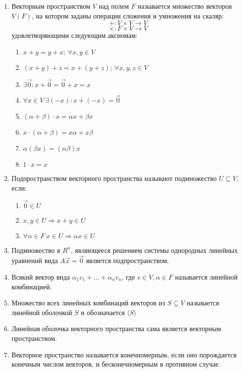 \documentclass[a4paper,12pt]{article}
\begin{document}
\begin{enumerate}
		\item Векторным пространством $V$ над полем $F$  называется множество векторов $V(F)$, на котором заданы операции сложения и умножения на скаляр:
		\[
		+: V \times V \to V\]\[
		\times: F \times V \to V
		\]
		удовлетворяющими следующим аксиомам:
		\begin{enumerate}
			\item $x + y = y + x; \ \forall x, y \in V$
			\item $(x + y) + z = x + (y + z); \ \forall x, y, z \in V$
			\item $\exists \vec{0}: x + \vec{0} = \vec{0} + x = x$
			\item $\forall x \in V \ \exists (-x): x + (-x) = \vec{0}$
			\item $(\alpha + \beta) \cdot x = \alpha x + \beta x$
			\item $x \cdot (\alpha + \beta) = x\alpha  + x\beta $
			\item $\alpha(\beta x) = (\alpha \beta) x$
			\item $1 \cdot x = x$
		\end{enumerate}
		
		
		\item Подпространством векторного пространства называют подмножество $U \subseteq V$, если:
		\begin{enumerate}
			\item $\vec{0} \in U$
			\item $x, y \in U \Rightarrow x + y \in U$
			\item $\forall \alpha \in F \ x \in U \Rightarrow \alpha x \in U$
		\end{enumerate}
		
		\item Подмножество в $R^n$, являющееся решением системы однородных линейных уравнений вида $A\vec{x} = \vec{0}$ является подпространством. 
		
		\item Всякий вектор вида $\alpha_1v_1 + \ldots + \alpha_nv_n$, где $v \in V, \alpha \in F$ называется линейной комбинацией.
		
		\item Множество всех линейных комбинаций векторов из $S \subseteq V$ называется линейной оболочкой $S$ и обозначается $\langle S \rangle$
		
		\item Линейная оболочка векторного пространства сама является векторным пространством.
		
		\item Векторное пространство называется конечномерным, если оно порождается конечным числом векторов, и бесконечномерным в противном случае.
		

\end{enumerate}
\end{document}
